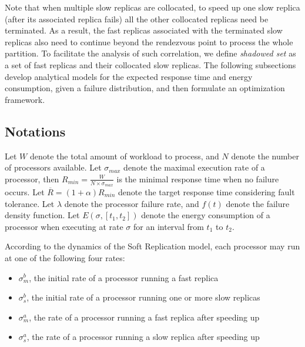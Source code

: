 Note that when multiple slow replicas are collocated, to speed up one slow replica (after its associated replica fails) all the other collocated replicas need be terminated. As a result, the fast replicas associated with the terminated slow replicas also need to continue beyond the rendezvous point to process the whole partition. To facilitate the analysis of such correlation, we define \textit{shadowed set} as a set of fast replicas and their collocated slow replicas. The following subsections develop analytical models for the expected response time and energy consumption, given a failure distribution, and then formulate an optimization framework. 

\subsection{Notations}
Let $W$ denote the total amount of workload to process, and $N$ denote the number of processors available. Let $\sigma_{max}$ denote the maximal execution rate of a processor, then $R_{min}=\frac{W}{N \times \sigma_{max}}$ is the minimal response time when no failure occurs. Let $\overline{R}=(1+\alpha)R_{min}$ denote the target response time considering fault tolerance. Let $\lambda$ denote the processor failure rate, and $f(t)$ denote the failure density function. Let $E(\sigma, [t_1, t_2])$ denote the energy consumption of a processor when executing at rate $\sigma$ for an interval from $t_1$ to $t_2$.

According to the dynamics of the Soft Replication model, each processor may run at one of the following four rates:
\begin{itemize}
	\item $\sigma_{m}^{b}$, the initial rate of a processor running a fast replica
    \item $\sigma_{s}^{b}$, the initial rate of a processor running one or more slow replicas
    \item $\sigma_{m}^{a}$, the rate of a processor running a fast replica after speeding up
    \item $\sigma_{s}^{a}$, the rate of a processor running a slow replica after speeding up
\end{itemize}

